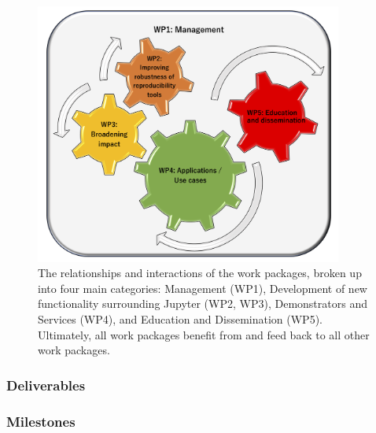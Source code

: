 \begin{figure}[htb]
  \centering
  \includegraphics[width=0.9\textwidth]{images/WP_low.png}
  \caption{
    \label{fig:workpackages}
    The relationships and interactions of the work packages,
    broken up into four main categories: Management (WP1),
    Development of new functionality surrounding Jupyter (WP2, WP3),
    Demonstrators and Services (WP4),
    and Education and Dissemination (WP5).
    Ultimately, all work packages benefit from and feed back to
    all other work packages.
  }
\end{figure}


\ganttchart[draft,xscale=.33,milestones]

\ifgrantagreement\else
\newpage
\subsubsection{Deliverables}\label{sec:deliverables}
\fi


\newpage
\subsubsection{Milestones}\label{sec:milestones}









